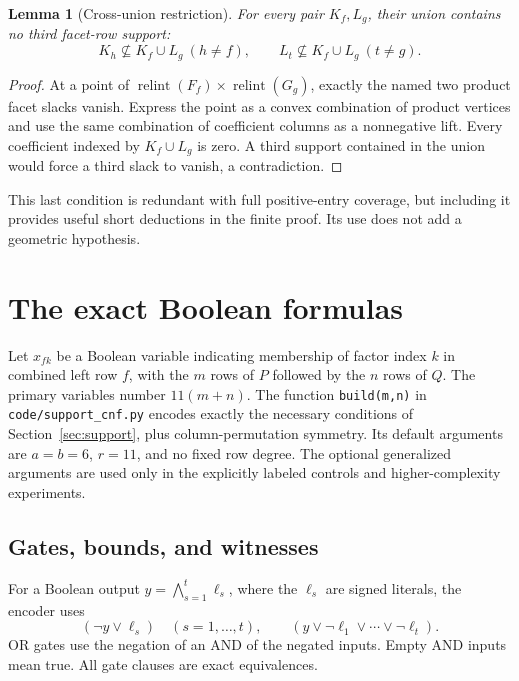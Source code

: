 \documentclass[11pt,a4paper]{article}
\newtheorem{lemma}[theorem]{Lemma}
\theoremstyle{definition}\newtheorem{definition}[theorem]{Definition}
\theoremstyle{remark}\newtheorem{remark}[theorem]{Remark}
\begin{document}
\begin{lemma}[Cross-union restriction]\label{lem:cross}
For every pair $K_f,L_g$, their union contains no third facet-row support:
\begin{equation}\label{eq:cross}
 K_h\not\subseteq K_f\cup L_g\ (h\ne f),\qquad
 L_t\not\subseteq K_f\cup L_g\ (t\ne g).
\end{equation}
\end{lemma}
\begin{proof}
At a point of $\operatorname{relint}(F_f)\times\operatorname{relint}(G_g)$,
exactly the named two product facet slacks vanish. Express the point as a
convex combination of product vertices and use the same combination of
coefficient columns as a nonnegative lift. Every coefficient indexed by
$K_f\cup L_g$ is zero. A third support contained in the union would force a
third slack to vanish, a contradiction.
\end{proof}

This last condition is redundant with full positive-entry coverage, but
including it provides useful short deductions in the finite proof. Its use
does not add a geometric hypothesis.

\section{The exact Boolean formulas}\label{sec:encoding}
Let $x_{fk}$ be a Boolean variable indicating membership of factor index $k$
in combined left row $f$, with the $m$ rows of $P$ followed by the $n$ rows
of $Q$. The primary variables number $11(m+n)$. The function
\texttt{build(m,n)} in \texttt{code/support\_cnf.py} encodes exactly the
necessary conditions of Section~\ref{sec:support}, plus column-permutation
symmetry. Its default arguments are $a=b=6$, $r=11$, and no fixed row degree.
The optional generalized arguments are used only in the explicitly labeled
controls and higher-complexity experiments.

\subsection{Gates, bounds, and witnesses}
For a Boolean output $y=\bigwedge_{s=1}^t\ell_s$, where the $\ell_s$ are signed
literals, the encoder uses
\[
 (\neg y\lor\ell_s)\quad(s=1,\ldots,t),\qquad
 (y\lor\neg\ell_1\lor\cdots\lor\neg\ell_t).
\]
OR gates use the negation of an AND of the negated inputs. Empty AND inputs
mean true. All gate clauses are exact equivalences.
\end{document}
